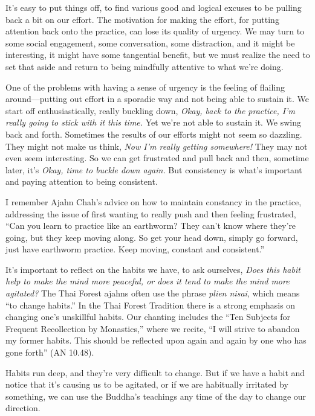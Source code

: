 It's easy to put things off, to find various good and logical excuses 
to be pulling back a bit on our effort. The motivation for making the 
effort, for putting attention back onto the practice, can lose its 
quality of urgency. We may turn to some social engagement, some 
conversation, some distraction, and it might be interesting, it might 
have some tangential benefit, but we must realize the need to set that 
aside and return to being mindfully attentive to what we're doing.

One of the problems with having a sense of urgency is the feeling of 
flailing around---putting out effort in a sporadic way and not being 
able to sustain it. We start off enthusiastically, really buckling 
down, \emph{Okay, back to the practice, I'm really going to stick with 
it this time.} Yet we're not able to sustain it. We swing back and 
forth. Sometimes the results of our efforts might not seem so dazzling. 
They might not make us think, \emph{Now I'm really getting somewhere!} 
They may not even seem interesting. So we can get frustrated and pull 
back and then, sometime later, it's \emph{Okay, time to buckle down 
again.} But consistency is what's important and paying attention to 
being consistent.

I remember Ajahn Chah's advice on how to maintain constancy in the 
practice, addressing the issue of first wanting to really push and then 
feeling frustrated, ``Can you learn to practice like an earthworm? They 
can't know where they're going, but they keep moving along. So get your 
head down, simply go forward, just have earthworm practice. Keep 
moving, constant and consistent.''


It's important to reflect on the habits we have, to ask ourselves, 
\emph{Does this habit help to make the mind more peaceful, or does it 
tend to make the mind more agitated?} The Thai Forest ajahns often use 
the phrase \emph{plien nisai}, which means ``to change habits.'' In the 
Thai Forest Tradition there is a strong emphasis on changing one's 
unskillful habits. Our chanting includes the ``Ten Subjects for 
Frequent Recollection by Monastics,'' where we recite, ``I will strive 
to abandon my former habits. This should be reflected upon again and 
again by one who has gone forth'' (AN 10.48).

Habits run deep, and they're very difficult to change. But if we have a 
habit and notice that it's causing us to be agitated, or if we are 
habitually irritated by something, we can use the Buddha's teachings 
any time of the day to change our direction.

